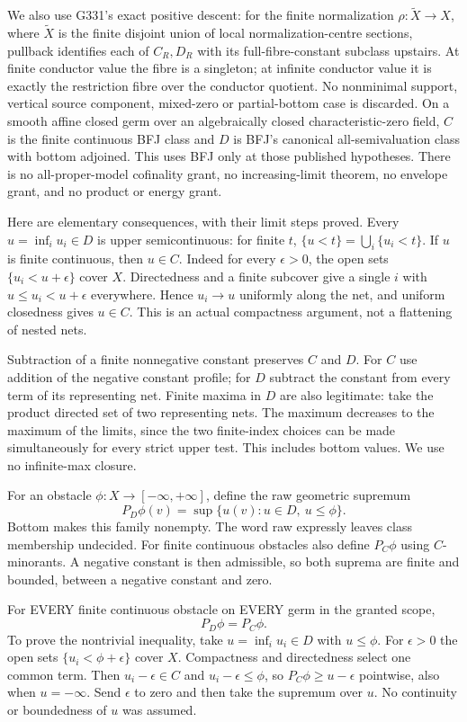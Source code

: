 \documentclass[11pt]{article}
\begin{document}
We also use G331's exact positive descent: for the finite normalization \(\rho:\widetilde X\to X\), where \(\widetilde X\) is the finite disjoint union of local normalization-centre sections, pullback identifies each of \(C_R,D_R\) with its full-fibre-constant subclass upstairs. At finite conductor value the fibre is a singleton; at infinite conductor value it is exactly the restriction fibre over the conductor quotient. No nonminimal support, vertical source component, mixed-zero or partial-bottom case is discarded. On a smooth affine closed germ over an algebraically closed characteristic-zero field, \(C\) is the finite continuous BFJ class and \(D\) is BFJ's canonical all-semivaluation class with bottom adjoined. This uses BFJ only at those published hypotheses. There is no all-proper-model cofinality grant, no increasing-limit theorem, no envelope grant, and no product or energy grant.

Here are elementary consequences, with their limit steps proved. Every \(u=\inf_i u_i\in D\) is upper semicontinuous: for finite \(t\), \(\{u<t\}=\bigcup_i\{u_i<t\}\). If \(u\) is finite continuous, then \(u\in C\). Indeed for every \(\epsilon>0\), the open sets \(\{u_i<u+\epsilon\}\) cover \(X\). Directedness and a finite subcover give a single \(i\) with \(u\le u_i<u+\epsilon\) everywhere. Hence \(u_i\to u\) uniformly along the net, and uniform closedness gives \(u\in C\). This is an actual compactness argument, not a flattening of nested nets.

Subtraction of a finite nonnegative constant preserves \(C\) and \(D\). For \(C\) use addition of the negative constant profile; for \(D\) subtract the constant from every term of its representing net. Finite maxima in \(D\) are also legitimate: take the product directed set of two representing nets. The maximum decreases to the maximum of the limits, since the two finite-index choices can be made simultaneously for every strict upper test. This includes bottom values. We use no infinite-max closure.

For an obstacle \(\phi:X\to[-\infty,+\infty]\), define the raw geometric supremum
\[
P_D\phi(v)=\sup\{u(v):u\in D,\ u\le\phi\}.
\]
Bottom makes this family nonempty. The word raw expressly leaves class membership undecided. For finite continuous obstacles also define \(P_C\phi\) using \(C\)-minorants. A negative constant is then admissible, so both suprema are finite and bounded, between a negative constant and zero.

For EVERY finite continuous obstacle on EVERY germ in the granted scope,
\[
P_D\phi=P_C\phi. \tag{1}
\]
To prove the nontrivial inequality, take \(u=\inf_i u_i\in D\) with \(u\le\phi\). For \(\epsilon>0\) the open sets \(\{u_i<\phi+\epsilon\}\) cover \(X\). Compactness and directedness select one common term. Then \(u_i-\epsilon\in C\) and \(u_i-\epsilon\le\phi\), so \(P_C\phi\ge u-\epsilon\) pointwise, also when \(u=-\infty\). Send \(\epsilon\) to zero and then take the supremum over \(u\). No continuity or boundedness of \(u\) was assumed.
\end{document}
